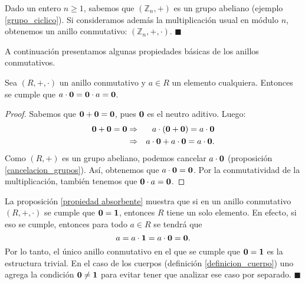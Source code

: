 \begin{example}
Dado un entero $n \geq 1$, sabemos que $(\mathbb{Z}_n, +)$ es un grupo abeliano (ejemplo \ref{grupo_ciclico}). Si consideramos además la multiplicación usual en módulo $n$, obtenemos un anillo conmutativo: $(\mathbb{Z}_n, +, \cdot)$. \hfill$\blacksquare$
\end{example}

A continuación presentamos algunas propiedades básicas de los anillos conmutativos.

\begin{proposition} \label{propiedad absorbente}
    Sea $(R, +, \cdot)$ un anillo conmutativo y $a \in R$ un elemento cualquiera. Entonces se cumple que $a\cdot \mathbf{0} =\mathbf{0}\cdot a= \mathbf{0}$.
\end{proposition}

\begin{proof}
Sabemos que $\mathbf{0}+\mathbf{0} = \mathbf{0}$, pues $\mathbf{0}$ es el neutro aditivo. Luego:
    \begin{eqnarray*}
\mathbf{0}+\mathbf{0} = \mathbf{0}		&\Rightarrow & a\cdot(\mathbf{0}+\mathbf{0}) = a\cdot \mathbf{0}\\
        &\Rightarrow &a\cdot \mathbf{0}+a\cdot \mathbf{0} = a\cdot \mathbf{0}.
    \end{eqnarray*}
Como $(R, +)$ es un grupo abeliano, podemos cancelar $a \cdot \mathbf{0}$ (proposición \ref{cancelacion_grupos}). Así, obtenemos que $a \cdot \mathbf{0} = \mathbf{0}$. Por la conmutatividad de la multiplicación, también tenemos que $\mathbf{0} \cdot a=\mathbf{0} $.
\end{proof}

\begin{remark} \label{obs_cero_distinto_a_uno}
    La proposición \ref{propiedad absorbente} muestra que si en un anillo conmutativo $(R, +, \cdot)$ se cumple que $\mathbf{0} = \mathbf{1}$, entonces $R$ tiene un solo elemento. En efecto, si eso se cumple, entonces para todo $a \in R$ se tendrá que
    $$a = a \cdot \mathbf{1} = a \cdot \mathbf{0} = \mathbf{0}.$$
    Por lo tanto, el único anillo conmutativo en el que se cumple que $\mathbf{0} = \mathbf{1}$ es la estructura trivial. En el caso de los cuerpos (definición \ref{definicion_cuerpo}) uno agrega la condición $\mathbf{0} \neq \mathbf{1}$ para evitar tener que analizar ese caso por separado.
    \hfill$\blacksquare$
\end{remark}

